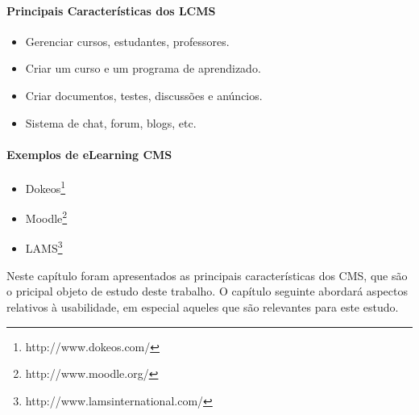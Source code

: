 \paragraph{Principais Características dos LCMS}

\begin{itemize}
  \item Gerenciar cursos, estudantes, professores.
  \item Criar um curso e um programa de aprendizado.
  \item Criar documentos, testes, discussões e anúncios.
  \item Sistema de chat, forum, blogs, etc.
\end{itemize}

\paragraph{Exemplos de eLearning CMS} 

\begin{itemize}
  \item Dokeos\footnote{http://www.dokeos.com/}
  \item Moodle\footnote{http://www.moodle.org/}
  \item LAMS\footnote{http://www.lamsinternational.com/}
\end{itemize}

Neste capítulo foram apresentados as principais características dos CMS, que são o pricipal objeto de estudo deste trabalho. O capítulo seguinte abordará aspectos relativos à usabilidade, em especial aqueles que são relevantes para este estudo.


